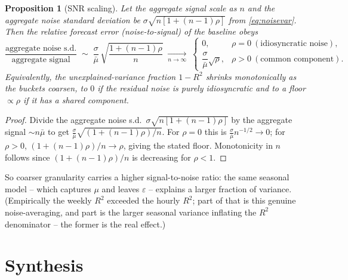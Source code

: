 \documentclass[11pt]{article}
\theoremstyle{plain}
\newtheorem{proposition}{Proposition}
\theoremstyle{remark}
\begin{document}
\begin{proposition}[SNR scaling]\label{prop:snr}
Let the aggregate signal scale as $n$ and the aggregate noise standard deviation be
$\sigma\sqrt{n[1+(n-1)\rho]}$ from \eqref{eq:noisevar}. Then the
\emph{relative} forecast error (noise-to-signal) of the baseline obeys
\[
\frac{\text{aggregate noise s.d.}}{\text{aggregate signal}}
\;\sim\; \frac{\sigma}{\bar\mu}\,\sqrt{\frac{1+(n-1)\rho}{n}}
\;\xrightarrow[n\to\infty]{}\;
\begin{cases}
0, & \rho = 0 \ (\text{idiosyncratic noise}),\\[4pt]
\dfrac{\sigma}{\bar\mu}\sqrt{\rho}, & \rho > 0 \ (\text{common component}).
\end{cases}
\]
Equivalently, the unexplained-variance fraction $1-R^2$ shrinks monotonically as the
buckets coarsen, to $0$ if the residual noise is purely idiosyncratic and to a
floor $\propto\rho$ if it has a shared component.
\end{proposition}

\begin{proof}
Divide the aggregate noise s.d.\ $\sigma\sqrt{n[1+(n-1)\rho]}$ by the aggregate
signal $\sim n\bar\mu$ to get $\frac{\sigma}{\bar\mu}\sqrt{(1+(n-1)\rho)/n}$. For
$\rho=0$ this is $\frac{\sigma}{\bar\mu}n^{-1/2}\to0$; for $\rho>0$,
$(1+(n-1)\rho)/n\to\rho$, giving the stated floor. Monotonicity in $n$ follows since
$(1+(n-1)\rho)/n$ is decreasing for $\rho<1$.
\end{proof}

\noindent
So coarser granularity carries a higher signal-to-noise ratio: the same seasonal
model -- which captures $\mu$ and leaves $\varepsilon$ -- explains a larger fraction
of variance. (Empirically the weekly $R^2$ exceeded the hourly $R^2$; part of that
is this genuine noise-averaging, and part is the larger seasonal variance inflating
the $R^2$ denominator -- the former is the real effect.)

\section{Synthesis}
\end{document}
